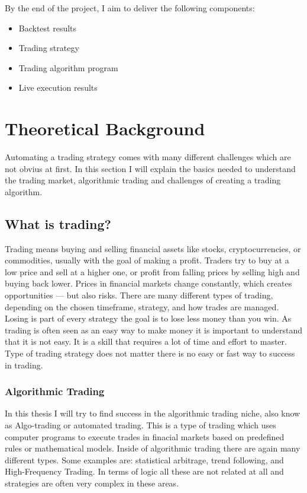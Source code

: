 \documentclass[12pt]{article}
\begin{document}
By the end of the project, I aim to deliver the following components:

\begin{itemize}
    \item Backtest results
    \item Trading strategy
    \item Trading algorithm program
    \item Live execution results
\end{itemize}




\newpage

\section{Theoretical Background}
Automating a trading strategy comes with many different challenges which are not obvius at first. In this section I will explain the basics needed to understand the trading market, algorithmic trading and challenges of creating a trading algorithm.







\subsection*{What is trading?}
Trading means buying and selling financial assets like stocks, cryptocurrencies, or commodities, usually with the goal of making a profit. Traders try to buy at a low price and sell at a higher one, or profit from falling prices by selling high and buying back lower. Prices in financial markets change constantly, which creates opportunities — but also risks. There are many different types of trading, depending on the chosen timeframe, strategy, and how trades are managed. Losing is part of every strategy the goal is to lose less money than you win.
As trading is often seen as an easy way to make money it is important to understand that it is not easy. It is a skill that requires a lot of time and effort to master. Type of trading strategy does not matter there is no easy or fast way to success in trading. 

\subsubsection*{Algorithmic Trading}
In this thesis I will try to find success in the algorithmic trading niche, also know as Algo-trading or automated trading. This is a type of trading which uses computer programs to execute trades in finacial markets based on predefined rules or mathematical models.  Inside of algorithmic trading there are again many different types. Some examples are: statistical arbitrage, trend following, and High-Frequency Trading. In terms of logic all these are not related at all and strategies are often very complex in these areas. 
\end{document}
